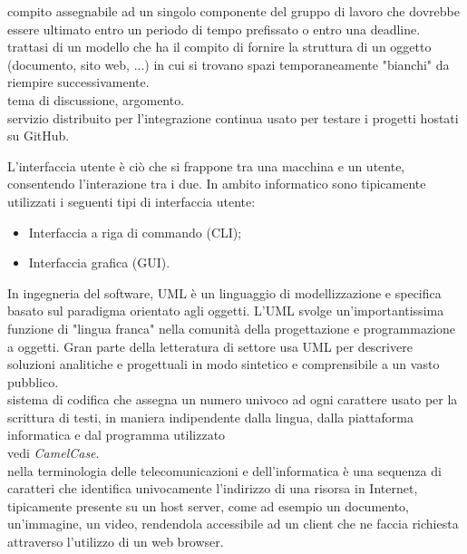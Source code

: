 \documentclass{scalatekids-article}
\begin{document}

   compito assegnabile ad un singolo componente del gruppo di lavoro che dovrebbe essere ultimato entro un periodo di tempo prefissato o entro una deadline.
  \\

   trattasi di un modello che ha il compito di fornire la struttura di un oggetto (documento, sito web, ...) in cui si trovano spazi temporaneamente "bianchi" da riempire successivamente.
  \\

   tema di discussione, argomento.
  \\

   servizio distribuito per l'integrazione continua usato per testare i progetti hostati su GitHub.
  \\


   L'interfaccia utente è ciò che si frappone tra una macchina e un utente, consentendo l'interazione tra i due. In ambito informatico sono tipicamente utilizzati i seguenti tipi di interfaccia utente:

  \begin{itemize}
  \item Interfaccia a riga di commando (CLI);
  \item Interfaccia grafica (GUI).
  \end{itemize}

   In ingegneria del software, UML è un linguaggio di modellizzazione e specifica basato sul paradigma orientato agli oggetti.
  L'UML svolge un'importantissima funzione di "lingua franca" nella comunità della progettazione e programmazione a oggetti. Gran parte della letteratura di settore usa UML per descrivere soluzioni analitiche e progettuali in modo sintetico e comprensibile a un vasto pubblico.
  \\

    sistema di codifica che assegna un numero univoco ad ogni carattere usato per la scrittura di testi, in maniera indipendente dalla lingua, dalla piattaforma informatica e dal programma utilizzato
   \\

   vedi \textit{CamelCase}.
  \\

   nella terminologia delle telecomunicazioni e dell'informatica è una sequenza di caratteri che identifica univocamente l'indirizzo di una risorsa in Internet, tipicamente presente su un host server, come ad esempio un documento, un'immagine, un video, rendendola accessibile ad un client che ne faccia richiesta attraverso l'utilizzo di un web browser.
  \\
\end{document}

